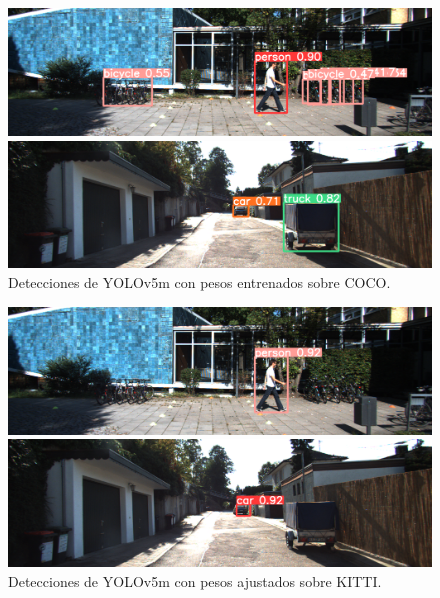 \begin{figure}[H]
	\begin{minipage}{0.495\textwidth}
		\centering
		\includegraphics[width=1\linewidth]{Book/figures/5_deteccion2d/yolo_coco_0.png}
	\end{minipage}\hfill
	\begin{minipage}{0.495\textwidth}
		\centering
		\includegraphics[width=1\linewidth]{Book/figures/5_deteccion2d/yolo_coco_1.png}
	\end{minipage}
	\caption{Detecciones de YOLOv5m con pesos entrenados sobre COCO.}
	\label{fig:Detecciones de YOLOv5m con pesos entrenados sobre COCO.}
\end{figure}

\begin{figure}[H]
	\begin{minipage}{0.495\textwidth}
		\centering
		\includegraphics[width=1\linewidth]{Book/figures/5_deteccion2d/yolo_kitti_0.png}
	\end{minipage}\hfill
	\begin{minipage}{0.495\textwidth}
		\centering
		\includegraphics[width=1\linewidth]{Book/figures/5_deteccion2d/yolo_kitti_1.png}
	\end{minipage}
	\caption{Detecciones de YOLOv5m con pesos ajustados sobre KITTI.}
	\label{fig:Detecciones de YOLOv5m con pesos ajustados sobre KITTI.}
\end{figure}

